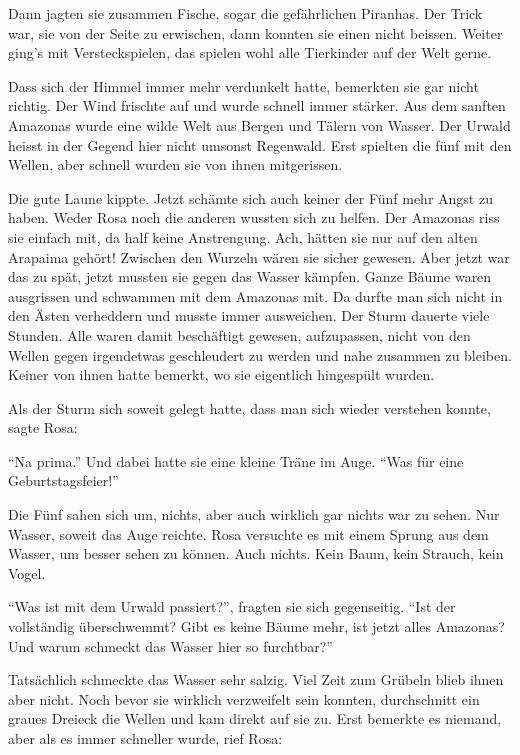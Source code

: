 Dann jagten sie zusammen Fische, sogar die gefährlichen Piranhas. Der Trick war, sie von der Seite zu erwischen, dann konnten sie einen nicht beissen. Weiter ging's mit Versteckspielen, das spielen wohl alle Tierkinder auf der Welt gerne.

Dass sich der Himmel immer mehr verdunkelt hatte, bemerkten sie gar nicht richtig. Der Wind frischte auf und wurde schnell immer stärker. Aus dem sanften Amazonas wurde eine wilde Welt aus Bergen und Tälern von Wasser. Der Urwald heisst in der Gegend hier nicht umsonst Regenwald. Erst spielten die fünf mit den Wellen, aber schnell wurden sie von ihnen mitgerissen.

Die gute Laune kippte. Jetzt schämte sich auch keiner der Fünf mehr Angst zu haben. Weder Rosa noch die anderen wussten sich zu helfen. Der Amazonas riss sie einfach mit, da half keine Anstrengung. Ach, hätten sie nur auf den alten Arapaima gehört! Zwischen den Wurzeln wären sie sicher gewesen. Aber jetzt war das zu spät, jetzt mussten sie gegen das Wasser kämpfen. Ganze Bäume waren ausgrissen und schwammen mit dem Amazonas mit. Da durfte man sich nicht in den Ästen verheddern und musste immer ausweichen. Der Sturm dauerte viele Stunden. Alle waren damit beschäftigt gewesen, aufzupassen, nicht von den Wellen gegen irgendetwas geschleudert zu werden und nahe zusammen zu bleiben. Keiner von ihnen hatte bemerkt, wo sie eigentlich hingespült wurden.

Als der Sturm sich soweit gelegt hatte, dass man sich wieder verstehen konnte, sagte Rosa:

\enquote{Na prima.} Und dabei hatte sie eine kleine Träne im Auge. \enquote{Was für eine Geburtstagsfeier!}

Die Fünf sahen sich um, nichts, aber auch wirklich gar nichts war zu sehen. Nur Wasser, soweit das Auge reichte. Rosa versuchte es mit einem Sprung aus dem Wasser, um besser sehen zu können. Auch nichts. Kein Baum, kein Strauch, kein Vogel.

\enquote{Was ist mit dem Urwald passiert?}, fragten sie sich gegenseitig. \enquote{Ist der vollständig überschwemmt? Gibt es keine Bäume mehr, ist jetzt alles Amazonas? Und warum schmeckt das Wasser hier so furchtbar?} 

Tatsächlich schmeckte das Wasser sehr salzig. Viel Zeit zum Grübeln blieb ihnen aber nicht. Noch bevor sie wirklich verzweifelt sein konnten, durchschnitt ein graues Dreieck die Wellen und kam direkt auf sie zu. Erst bemerkte es niemand, aber als es immer schneller wurde, rief Rosa:

